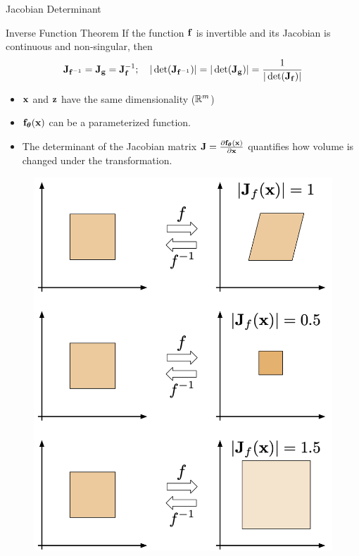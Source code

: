 \documentclass{beamer}
\begin{document}
\begin{frame}{Jacobian Determinant}
	\begin{block}{Inverse Function Theorem}
		If the function $\mathbf{f}$ is invertible and its Jacobian is continuous and non-singular, then
		\vspace{-0.3cm}
		\[
		\mathbf{J}_{\mathbf{f}^{-1}} = \mathbf{J}_{\mathbf{g}} = \mathbf{J}_{\mathbf{f}}^{-1}; \quad |\det (\mathbf{J}_{\mathbf{f}^{-1}})| = |\det (\mathbf{J}_{\mathbf{g}})| = \frac{1}{|\det (\mathbf{J}_{\mathbf{f}})|}
		\]
		\vspace{-0.3cm}
	\end{block}
	\begin{minipage}{0.55\columnwidth}
		\begin{itemize}
			\item $\mathbf{x}$ and $\mathbf{z}$ have the same dimensionality ($\mathbb{R}^m$)
			\vfill
			\item $\mathbf{f}_{\boldsymbol{\theta}}(\mathbf{x})$ can be a parameterized function.
			\vfill
			\item The determinant of the Jacobian matrix $\mathbf{J} =\frac{\partial \mathbf{f}_{\boldsymbol{\theta}}(\mathbf{x})}{\partial \mathbf{x}}$ quantifies how volume is changed under the transformation.
		\end{itemize}
	\end{minipage}%
	\begin{minipage}{0.45\columnwidth}
		\begin{figure}
			\includegraphics[width=0.8\linewidth]{figs/jacobian_det}
		\end{figure}
	\end{minipage}
\end{frame}
\end{document}
